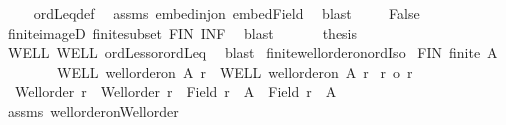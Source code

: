 \begin{isabellebody}
\ \ \ \isamarkupfalse%
\ ordLeq{\isacharunderscore}{\kern0pt}def\ \isamarkupfalse%
\ assms\ embed{\isacharunderscore}{\kern0pt}inj{\isacharunderscore}{\kern0pt}on\ embed{\isacharunderscore}{\kern0pt}Field\ \isamarkupfalse%
\ blast\isanewline
\ \ \ \isamarkupfalse%
\ False\ \isamarkupfalse%
\ finite{\isacharunderscore}{\kern0pt}imageD\ finite{\isacharunderscore}{\kern0pt}subset\ FIN\ INF\ \isamarkupfalse%
\ blast\isanewline
\ \ \isacommand{{\isacharbraceright}{\kern0pt}}\isamarkupfalse%
\isanewline
\ \ \isamarkupfalse%
\ {\isacharquery}{\kern0pt}thesis\ \isamarkupfalse%
\ WELL\ WELL{\isacharprime}{\kern0pt}\ ordLess{\isacharunderscore}{\kern0pt}or{\isacharunderscore}{\kern0pt}ordLeq\ \isamarkupfalse%
\ blast\isanewline
{}\isamarkupfalse%
%
\endisatagproof
{\isafoldproof}%
%
\isadelimproof
\isanewline
%
\endisadelimproof
\isanewline
{}\isamarkupfalse%
\ finite{\isacharunderscore}{\kern0pt}well{\isacharunderscore}{\kern0pt}order{\isacharunderscore}{\kern0pt}on{\isacharunderscore}{\kern0pt}ordIso{\isacharcolon}{\kern0pt}\isanewline
{}\ FIN{\isacharcolon}{\kern0pt}\ {\isachardoublequoteopen}finite\ A{\isachardoublequoteclose}\ \isanewline
\ \ \ \ \ \ \ \ WELL{\isacharcolon}{\kern0pt}\ {\isachardoublequoteopen}well{\isacharunderscore}{\kern0pt}order{\isacharunderscore}{\kern0pt}on\ A\ r{\isachardoublequoteclose}\ \ WELL{\isacharprime}{\kern0pt}{\isacharcolon}{\kern0pt}\ {\isachardoublequoteopen}well{\isacharunderscore}{\kern0pt}order{\isacharunderscore}{\kern0pt}on\ A\ r{\isacharprime}{\kern0pt}{\isachardoublequoteclose}\isanewline
{}\ {\isachardoublequoteopen}r\ {\isacharequal}{\kern0pt}o\ r{\isacharprime}{\kern0pt}{\isachardoublequoteclose}\isanewline
%
\isadelimproof
%
\endisadelimproof
%
\isatagproof
{}\isamarkupfalse%
{\isacharminus}{\kern0pt}\isanewline
\ \ \isamarkupfalse%
\ {}{\isacharcolon}{\kern0pt}\ {\isachardoublequoteopen}Well{\isacharunderscore}{\kern0pt}order\ r\ {\isasymand}\ Well{\isacharunderscore}{\kern0pt}order\ r{\isacharprime}{\kern0pt}\ {\isasymand}\ Field\ r\ {\isacharequal}{\kern0pt}\ A\ {\isasymand}\ Field\ r{\isacharprime}{\kern0pt}\ {\isacharequal}{\kern0pt}\ A{\isachardoublequoteclose}\isanewline
\ \ \isamarkupfalse%
\ assms\ well{\isacharunderscore}{\kern0pt}order{\isacharunderscore}{\kern0pt}on{\isacharunderscore}{\kern0pt}Well{\isacharunderscore}{\kern0pt}order\ \isamarkupfalse%

\end{isabellebody}
